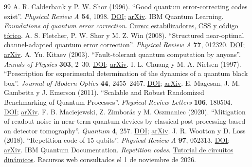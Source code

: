 \documentclass[11pt,a4paper]{article}
\begin{document}
\clearpage
\renewcommand{\refname}{Referencias}
\begingroup
\small
\begin{thebibliography}{99}
\setlength{\itemsep}{5pt}
\setlength{\parskip}{0pt}
 A. R. Calderbank y P. W. Shor (1996). ``Good quantum error-correcting codes exist''. \emph{Physical Review A} \textbf{54}, 1098. \href{https://doi.org/10.1103/PhysRevA.54.1098}{DOI}; \href{https://arxiv.org/abs/quant-ph/9512032}{arXiv}.
 IBM Quantum Learning. \emph{Foundations of quantum error correction}. \href{https://learning.quantum.ibm.com/course/foundations-of-quantum-error-correction}{Curso: estabilizadores, CSS y código tórico}.
 A. S. Fletcher, P. W. Shor y M. Z. Win (2008). ``Structured near-optimal channel-adapted quantum error correction''. \emph{Physical Review A} \textbf{77}, 012320. \href{https://doi.org/10.1103/PhysRevA.77.012320}{DOI}; \href{https://arxiv.org/abs/0708.3658}{arXiv}.
 A. Yu. Kitaev (2003). ``Fault-tolerant quantum computation by anyons''. \emph{Annals of Physics} \textbf{303}, 2--30. \href{https://doi.org/10.1016/S0003-4916(02)00018-0}{DOI}; \href{https://arxiv.org/abs/quant-ph/9707021}{arXiv}.
 I. L. Chuang y M. A. Nielsen (1997). ``Prescription for experimental determination of the dynamics of a quantum black box''. \emph{Journal of Modern Optics} \textbf{44}, 2455--2467. \href{https://doi.org/10.1080/09500349708231894}{DOI}; \href{https://arxiv.org/abs/quant-ph/9610001}{arXiv}.
 E. Magesan, J. M. Gambetta y J. Emerson (2011). ``Scalable and Robust Randomized Benchmarking of Quantum Processes''. \emph{Physical Review Letters} \textbf{106}, 180504. \href{https://doi.org/10.1103/PhysRevLett.106.180504}{DOI}; \href{https://arxiv.org/abs/1009.3639}{arXiv}.
 F. B. Maciejewski, Z. Zimborás y M. Oszmaniec (2020). ``Mitigation of readout noise in near-term quantum devices by classical post-processing based on detector tomography''. \emph{Quantum} \textbf{4}, 257. \href{https://doi.org/10.22331/q-2020-04-24-257}{DOI}; \href{https://arxiv.org/abs/1907.08518}{arXiv}.
 J. R. Wootton y D. Loss (2018). ``Repetition code of 15 qubits''. \emph{Physical Review A} \textbf{97}, 052313. \href{https://doi.org/10.1103/PhysRevA.97.052313}{DOI}; \href{https://arxiv.org/abs/1709.00990}{arXiv}.
 IBM Quantum Documentation. \emph{Repetition codes}. \href{https://quantum.cloud.ibm.com/docs/en/tutorials/repetition-codes}{Tutorial de circuitos dinámicos}. Recursos web consultados el 1 de noviembre de 2026.

\end{thebibliography}
\end{document}
